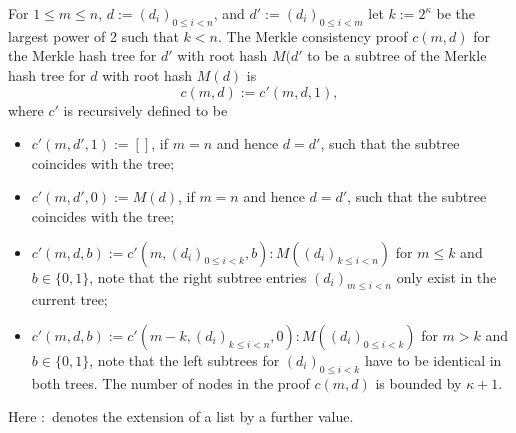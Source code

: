 \begin{definition}
For \(1 \le m \le  n\), \(d := (d_i)_{0 \le i < n}\), 
and \(d' := (d_i)_{0 \le i < m}\) let \(k := 2^\kappa\) 
be the largest 
power of 2 such that \(k < n\). The Merkle consistency proof \(c(m, d)\) for 
the Merkle hash tree for \(d'\) with root hash \(M(d'\) to be a subtree of 
the Merkle hash tree for \(d\) with root hash \(M(d)\) is 
\[c(m,d) := c'(m,d,1),\]
where \(c'\)
is recursively defined to be 
\begin{itemize}
\item \(c'(m,d',1) := []\), if \(m=n\) and hence \(d=d'\), such that
the subtree coincides with the tree;
\item \(c'(m,d',0) := M(d)\), if \(m=n\) and hence \(d=d'\), such that 
the subtree coincides with the tree; 
\item \(c'(m,d,b) := c'(m, (d_i)_{0 \le i < k},b) : M( (d_i)_{k \le i < n})\) for \(m \le k\) and
\(b \in \{0,1\}\), note that the right subtree entries 
\((d_i)_{m \le i < n}\) only exist in the current tree;
\item \(c'(m,d,b) := c'(m-k, (d_i)_{k \le i < n},0) : M( (d_i)_{0 \le i < k})\) for \(m > k\) and
\(b \in \{0,1\}\), note that the left subtrees for \((d_i)_{0 \le i < k}\) have to be identical 
in both trees.  The number of nodes in the proof \(c(m,d)\) is bounded by \(\kappa + 1\).
\end{itemize}
Here \(:\) denotes the extension of a list by a further value.
\end{definition}

